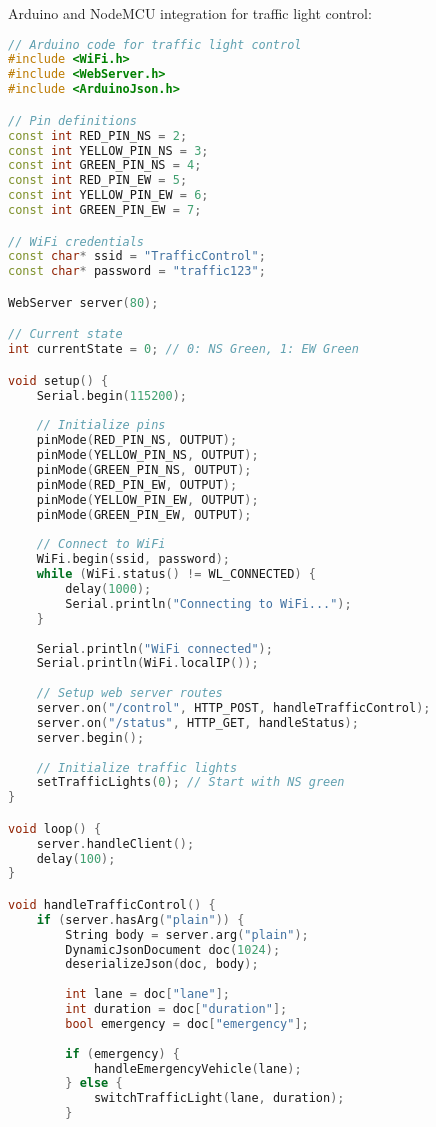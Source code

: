 Arduino and NodeMCU integration for traffic light control:

\begin{lstlisting}[language=C++, caption=Arduino Traffic Light Control]
// Arduino code for traffic light control
#include <WiFi.h>
#include <WebServer.h>
#include <ArduinoJson.h>

// Pin definitions
const int RED_PIN_NS = 2;
const int YELLOW_PIN_NS = 3;
const int GREEN_PIN_NS = 4;
const int RED_PIN_EW = 5;
const int YELLOW_PIN_EW = 6;
const int GREEN_PIN_EW = 7;

// WiFi credentials
const char* ssid = "TrafficControl";
const char* password = "traffic123";

WebServer server(80);

// Current state
int currentState = 0; // 0: NS Green, 1: EW Green

void setup() {
    Serial.begin(115200);
    
    // Initialize pins
    pinMode(RED_PIN_NS, OUTPUT);
    pinMode(YELLOW_PIN_NS, OUTPUT);
    pinMode(GREEN_PIN_NS, OUTPUT);
    pinMode(RED_PIN_EW, OUTPUT);
    pinMode(YELLOW_PIN_EW, OUTPUT);
    pinMode(GREEN_PIN_EW, OUTPUT);
    
    // Connect to WiFi
    WiFi.begin(ssid, password);
    while (WiFi.status() != WL_CONNECTED) {
        delay(1000);
        Serial.println("Connecting to WiFi...");
    }
    
    Serial.println("WiFi connected");
    Serial.println(WiFi.localIP());
    
    // Setup web server routes
    server.on("/control", HTTP_POST, handleTrafficControl);
    server.on("/status", HTTP_GET, handleStatus);
    server.begin();
    
    // Initialize traffic lights
    setTrafficLights(0); // Start with NS green
}

void loop() {
    server.handleClient();
    delay(100);
}

void handleTrafficControl() {
    if (server.hasArg("plain")) {
        String body = server.arg("plain");
        DynamicJsonDocument doc(1024);
        deserializeJson(doc, body);
        
        int lane = doc["lane"];
        int duration = doc["duration"];
        bool emergency = doc["emergency"];
        
        if (emergency) {
            handleEmergencyVehicle(lane);
        } else {
            switchTrafficLight(lane, duration);
        }
        

\end{lstlisting}
